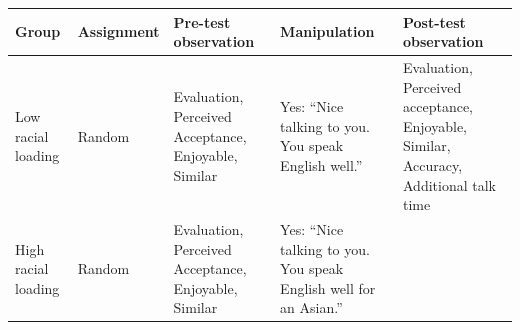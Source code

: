 \documentclass[
  english,
]{book}
\begin{document}
\begin{longtable}[]{@{}lllll@{}}
\toprule
\begin{minipage}[b]{0.10\columnwidth}\raggedright
Group\strut
\end{minipage} & \begin{minipage}[b]{0.17\columnwidth}\raggedright
Assignment\strut
\end{minipage} & \begin{minipage}[b]{0.22\columnwidth}\raggedright
Pre-test observation\strut
\end{minipage} & \begin{minipage}[b]{0.15\columnwidth}\raggedright
Manipulation\strut
\end{minipage} & \begin{minipage}[b]{0.22\columnwidth}\raggedright
Post-test observation\strut
\end{minipage}\tabularnewline
\midrule
\endhead
\begin{minipage}[t]{0.10\columnwidth}\raggedright
Low racial loading\strut
\end{minipage} & \begin{minipage}[t]{0.17\columnwidth}\raggedright
Random\strut
\end{minipage} & \begin{minipage}[t]{0.22\columnwidth}\raggedright
Evaluation, Perceived Acceptance, Enjoyable, Similar\strut
\end{minipage} & \begin{minipage}[t]{0.15\columnwidth}\raggedright
Yes: ``Nice talking to you. You speak English well.''\strut
\end{minipage} & \begin{minipage}[t]{0.22\columnwidth}\raggedright
Evaluation, Perceived acceptance, Enjoyable, Similar, Accuracy, Additional talk time\strut
\end{minipage}\tabularnewline
\begin{minipage}[t]{0.10\columnwidth}\raggedright
High racial loading\strut
\end{minipage} & \begin{minipage}[t]{0.17\columnwidth}\raggedright
Random\strut
\end{minipage} & \begin{minipage}[t]{0.22\columnwidth}\raggedright
Evaluation, Perceived Acceptance, Enjoyable, Similar\strut
\end{minipage} & \begin{minipage}[t]{0.15\columnwidth}\raggedright
Yes: ``Nice talking to you. You speak English well for an Asian.''\strut

\end{minipage}
\end{longtable}
\end{document}
